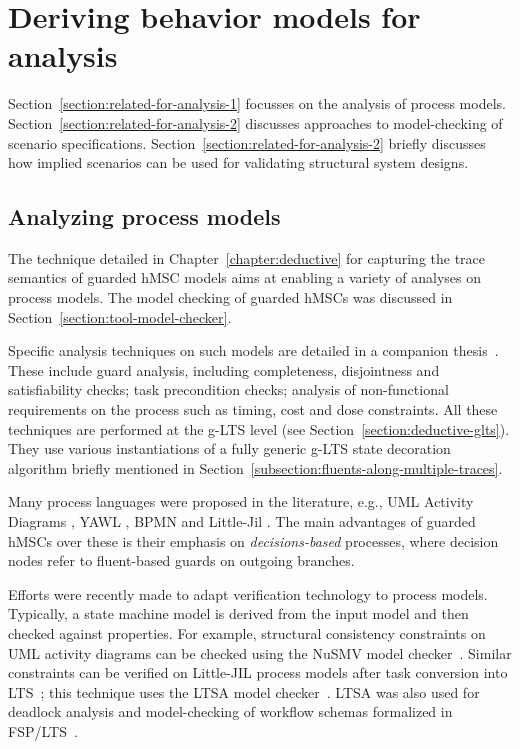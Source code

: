 \section{Deriving behavior models for analysis\label{section:related-for-analysis}}

Section~\ref{section:related-for-analysis-1} focusses on the analysis of process models. Section~\ref{section:related-for-analysis-2} discusses approaches to model-checking of scenario specifications. Section~\ref{section:related-for-analysis-2} briefly discusses how implied scenarios can be used for validating structural system designs.


\subsection{Analyzing process models\label{section:related-for-analysis-1}}

The technique detailed in Chapter~\ref{chapter:deductive} for capturing the trace semantics of guarded hMSC models aims at enabling a variety of analyses on process models. The model checking of guarded hMSCs was discussed in Section~\ref{section:tool-model-checker}. 

Specific analysis techniques on such models are detailed in a companion thesis~\cite{Damas:2011}. These include guard analysis, including completeness, disjointness and satisfiability checks; task precondition checks; analysis of non-functional requirements on the process such as timing, cost and dose constraints. All these techniques are performed at the g-LTS level (see Section~\ref{section:deductive-glts}). They use various instantiations of a fully generic g-LTS state decoration algorithm briefly mentioned in Section~\ref{subsection:fluents-along-multiple-traces}.

Many process languages were proposed in the literature, e.g., UML Activity Diagrams \cite{OMG:2004}, YAWL \cite{Vanderaalst:2005}, BPMN \cite{OMG:2008} and Little-Jil \cite{Clarke:2008}. The main advantages of guarded hMSCs over these is their emphasis on \emph{decisions-based} processes, where decision nodes refer to fluent-based guards on outgoing branches.

Efforts were recently made to adapt verification technology to process models. Typically, a state machine model is derived from the input model and then checked against properties. For example, structural consistency constraints on UML activity diagrams can be checked using the NuSMV model checker~\cite{Eshuis:2006}. Similar constraints can be verified on Little-JIL process models after task conversion into LTS~\cite{Lerner:2004}; this technique uses the LTSA model checker~\cite{Magee:1999}. LTSA was also used for deadlock analysis and model-checking of workflow schemas formalized in FSP/LTS~\cite{Karamanolis:2000}.

